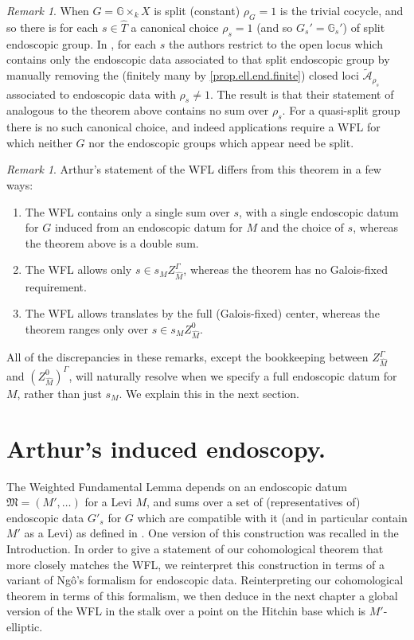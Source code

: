\documentclass[openany]{amsbook}
\theoremstyle{definition}
\theoremstyle{remark}
\newtheorem{remark}[theorem]{Remark}
\numberwithin{equation}{section}
\newcommand{\G}{\mathbb{G}}
\newcommand{\cA}{\mathcal{A}}
\renewcommand{\-}{\operatorname{-}}
\newcommand{\ctA}{\widetilde{\cA}}
\newcommand{\fM}{\mathfrak{M}}
\begin{document}
\begin{remark}\label{rmk.split.end.datum.restriction.CL}
    When $G = \G \times_k X$ is split (constant) $\rho_G = 1$ is the trivial cocycle, and so there is for each $s \in \widehat{T}$ a canonical choice $\rho_s = 1$ (and so $G_s' = \G_s'$) of split endoscopic group. In \cite{CLII}, for each $s$ the authors restrict to the open locus which contains only the endoscopic data associated to that split endoscopic group by manually removing the (finitely many by \ref{prop.ell.end.finite}) closed loci $\ctA_{\rho_s}$ associated to endoscopic data with $\rho_s \neq 1$. The result is that their statement of analogous to the theorem above contains no sum over $\rho_s$. For a quasi-split group there is no such canonical choice, and indeed applications require a WFL for which neither $G$ nor the endoscopic groups which appear need be split. 
\end{remark}

\begin{remark}\label{rmk.discrep.cWFL.vs.Arthur}
    Arthur's statement of the WFL differs from this theorem in a few ways:
\begin{enumerate}
    \item The WFL contains only a single sum over $s$, with a single endoscopic datum for $G$ induced from an endoscopic datum for $M$ and the choice of $s$, whereas the theorem above is a double sum.
    \item The WFL allows only $s \in s_M Z_{\widehat{M}}^\Gamma$, whereas the theorem has no Galois-fixed requirement.
    \item The WFL allows translates by the full (Galois-fixed) center, whereas the theorem ranges only over $s \in s_M Z^0_{\widehat{M}}$.
\end{enumerate}
\end{remark}

All of the discrepancies in these remarks, except the bookkeeping between $Z_{\widehat{M}}^\Gamma$ and $(Z_{\widehat{M}}^0)^\Gamma$, will naturally resolve when we specify a full endoscopic datum for $M$, rather than just $s_M$. We explain this in the next section.


\section{Arthur's induced endoscopy.}\label{subsect.ind.endoscopy}

The Weighted Fundamental Lemma depends on an endoscopic datum $\fM = (M', \ldots)$ for a Levi $M$, and sums over a set of (representatives of) endoscopic data $G'_s$ for $G$ which are compatible with it (and in particular contain $M'$ as a Levi) as defined in \cite[\S 4]{arthurenddatalevi}. One version of this construction was recalled in the Introduction. In order to give a statement of our cohomological theorem that more closely matches the WFL, we reinterpret this construction in terms of a variant of Ng\^{o}'s formalism for endoscopic data. Reinterpreting our cohomological theorem in terms of this formalism, we then deduce in the next chapter a global version of the WFL in the stalk over a point on the Hitchin base which is $M'$-elliptic.
\end{document}
